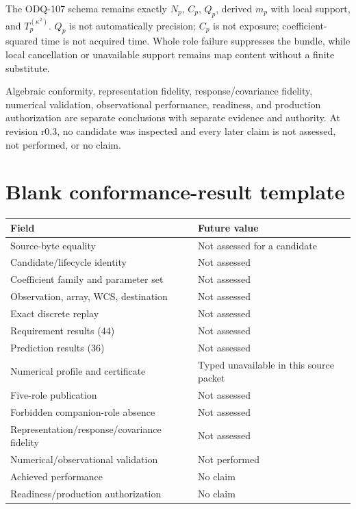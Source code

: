 \documentclass[10pt]{article}
\newcommand{\DocumentRevision}{r0.3}
\begin{document}
The ODQ-107 schema remains exactly $N_p$, $C_p$, $Q_p$, derived $m_p$ with
local support, and $T_p^{(\kappa^2)}$.  $Q_p$ is not automatically precision;
$C_p$ is not exposure; coefficient-squared time is not acquired time.  Whole
role failure suppresses the bundle, while local cancellation or unavailable
support remains map content without a finite substitute.

Algebraic conformity, representation fidelity, response/covariance fidelity,
numerical validation, observational performance, readiness, and production
authorization are separate conclusions with separate evidence and authority.
At revision \DocumentRevision{}, no candidate was inspected and every later
claim is not assessed, not performed, or no claim.

\clearpage







\clearpage
\section{Blank conformance-result template}
\label{sec:eng-template}

\begin{longtable}{@{}>{\raggedright\arraybackslash}p{}
                        >{\raggedright\arraybackslash}p{}@{}}
\toprule
Field & Future value \\
\midrule
Source-byte equality & Not assessed for a candidate \\
Candidate/lifecycle identity & Not assessed \\
Coefficient family and parameter set & Not assessed \\
Observation, array, WCS, destination & Not assessed \\
Exact discrete replay & Not assessed \\
Requirement results (44) & Not assessed \\
Prediction results (36) & Not assessed \\
Numerical profile and certificate & Typed unavailable in this source packet \\
Five-role publication & Not assessed \\
Forbidden companion-role absence & Not assessed \\
Representation/response/covariance fidelity & Not assessed \\
Numerical/observational validation & Not performed \\
Achieved performance & No claim \\
Readiness/production authorization & No claim \\
\bottomrule
\end{longtable}
\end{document}
